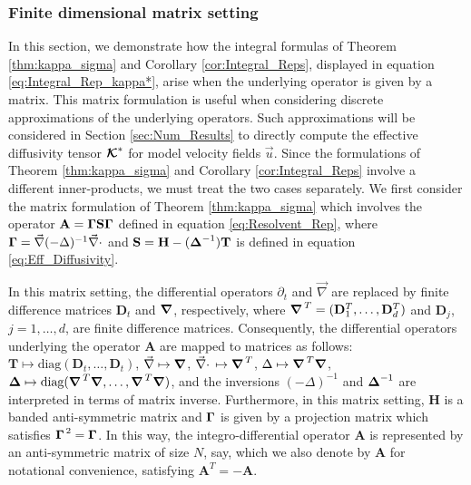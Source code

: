 \documentclass[11pt]{amsart}
\newcommand{\Tb}{\mathbf{T}}
\newcommand{\Hb}{\mathbf{H}}
\newcommand{\Sb}{\mathbf{S}}
\newcommand{\Ab}{\mathbf{A}}
\newcommand{\Db}{\mathbf{D}}
\newcommand\Kbc{\mbox{\boldmath${\mathcal{K}}$}}
\newcommand\bDelta{\mbox{\boldmath${\Delta}$}}
\newcommand\bGamma{\mbox{\boldmath${\Gamma}$}}
\newcommand\Bnabla{\mbox{\boldmath${\nabla}$}}
\begin{document}
%
\subsubsection{Finite dimensional matrix
  setting} \label{sec:Integral_Rep_Matrix}  
%
In this section, we demonstrate how the integral formulas of Theorem
\ref{thm:kappa_sigma} and Corollary \ref{cor:Integral_Reps}, displayed 
in equation \eqref{eq:Integral_Rep_kappa*}, arise when the underlying
operator is given by a matrix. This matrix formulation is useful when
considering discrete approximations of the underlying operators. Such
approximations will be considered in Section \ref{sec:Num_Results} to
directly compute the effective diffusivity tensor $\Kbc^*$ for model
velocity fields $\vec{u}$. Since the formulations of Theorem
\ref{thm:kappa_sigma} and Corollary \ref{cor:Integral_Reps} involve a
different inner-products, we must treat the two cases separately. We
first consider the matrix formulation of Theorem \ref{thm:kappa_sigma}
which involves the operator $\Ab=\bGamma\Sb\bGamma$ defined in
equation \eqref{eq:Resolvent_Rep}, where
$\bGamma=\vec{\nabla}(-\Delta)^{-1}\vec{\nabla}\cdot$ and $\Sb=\Hb-(\bDelta^{-1})\Tb$ is
defined in equation \eqref{eq:Eff_Diffusivity}.  




In this matrix setting, the differential operators $\partial_t$ and $\vec{\nabla}$
are replaced by finite difference matrices $\Db_t$ and $\Bnabla$,
respectively, where $\Bnabla^{\,T}=(\Db_1^T,\ldots,\Db_d^T)$ and $\Db_j$,
$j=1,\ldots,d$, are finite difference matrices. Consequently, the
differential operators underlying the operator $\Ab$ are mapped to
matrices as follows: $\Tb\mapsto\text{diag}(\Db_t,\ldots,\Db_t)$,
$\vec{\nabla}\mapsto\Bnabla$, $\vec{\nabla}\cdot\,\mapsto\Bnabla^{\,T}$,
$\Delta\mapsto\Bnabla^{\,T}\Bnabla$,
$\bDelta\mapsto\text{diag}(\Bnabla^{\,T}\Bnabla,\ldots,\Bnabla^{\,T}\Bnabla)$,
and the inversions $(-\Delta)^{-1}$ and $\bDelta^{-1}$ are interpreted in
terms of matrix inverse. Furthermore, in this matrix setting, $\Hb$ is
a banded anti-symmetric matrix and $\bGamma$ is given by a projection
matrix which satisfies $\bGamma^{\,2}=\bGamma$. In this way, the
integro-differential operator $\Ab$ is represented by an
anti-symmetric matrix of size $N$, say, which we also denote by $\Ab$
for notational convenience, satisfying $\Ab^T=-\Ab$.     





 
\end{document}

